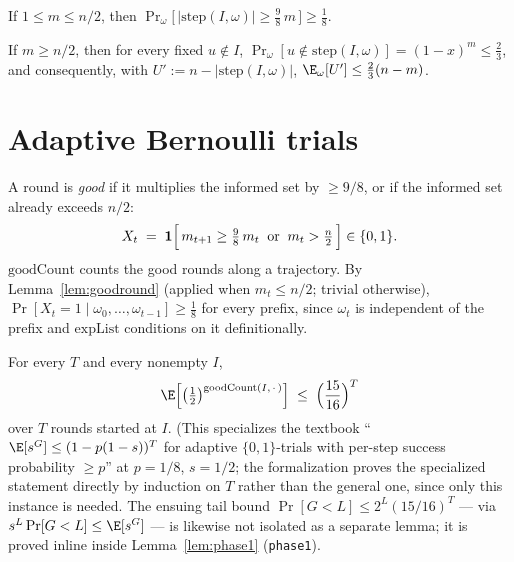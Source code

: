 \begin{lemma}\label{lem:goodround}
  \leanok
  If $1 \le m \le n/2$, then
  $\Pr_\omega\bigl[\,|\mathrm{step}(I,\omega)| \ge \tfrac{9}{8}\,m\,\bigr]
    \ge \tfrac18$.
\end{lemma}

\begin{lemma}\label{lem:contract}
  \leanok
  If $m \ge n/2$, then for every fixed $u \notin I$,
  $\Pr_\omega[u \notin \mathrm{step}(I,\omega)] = (1-x)^m \le \tfrac23$, and
  consequently, with $U' := n - |\mathrm{step}(I,\omega)|$,
  $\E_\omega[U'] \le \tfrac23(n-m)$.
\end{lemma}

\section{Adaptive Bernoulli trials}\label{sec:adaptive}

\begin{definition}\label{def:good}
  \leanok
  A round is \emph{good} if it multiplies the informed set by $\ge 9/8$, or
  if the informed set already exceeds $n/2$:
  \[
    X_t \;=\; \mathbf{1}\Bigl[\, m_{t+1} \ge \tfrac98\, m_t
    \;\;\text{or}\;\; m_t > \tfrac n2 \,\Bigr] \in \{0,1\}.
  \]
  $\mathrm{goodCount}$ counts the good rounds along a trajectory. By
  Lemma~\ref{lem:goodround} (applied when $m_t \le n/2$; trivial otherwise),
  $\Pr[X_t = 1 \mid \omega_0,\dots,\omega_{t-1}] \ge \tfrac18$ for every
  prefix, since $\omega_t$ is independent of the prefix and
  $\mathrm{expList}$ conditions on it definitionally.
\end{definition}

\begin{lemma}\label{lem:adaptive}
  \leanok
  For every $T$ and every nonempty $I$,
  \[
    \E\Bigl[\bigl(\tfrac12\bigr)^{\mathrm{goodCount}(I,\,\cdot\,)}\Bigr]
      \;\le\; \Bigl(\frac{15}{16}\Bigr)^{T}
  \]
  over $T$ rounds started at $I$. (This specializes the textbook
  ``$\E[s^G] \le (1-p(1-s))^T$ for adaptive $\{0,1\}$-trials with
  per-step success probability $\ge p$'' at $p = 1/8$, $s = 1/2$; the
  formalization proves the specialized statement directly by induction on
  $T$ rather than the general one, since only this instance is needed. The
  ensuing tail bound $\Pr[G < L] \le 2^{L}(15/16)^{T}$ — via
  $s^{L}\Pr[G<L] \le \E[s^G]$ — is likewise not isolated as a separate
  lemma; it is proved inline inside Lemma~\ref{lem:phase1}
  (\texttt{phase1}).
\end{lemma}

